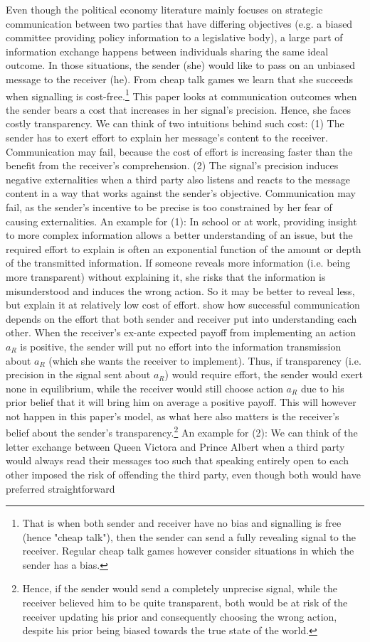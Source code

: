 \documentclass[paper=a4,12pt,DIV=11,twoside=false]{scrartcl}
\begin{document}
\noindent Even though the political economy literature mainly focuses on strategic communication between two parties that have differing objectives (e.g. a biased committee providing policy information to a legislative body), a large part of information exchange happens between individuals sharing the same ideal outcome. In those situations, the sender (she) would like to pass on an unbiased message to the receiver (he). From cheap talk games we learn that she succeeds when signalling is cost-free.\footnote{That is when both sender and receiver have no bias and signalling is free (hence "cheap talk"), then the sender can send a fully revealing signal to the receiver. Regular cheap talk games however consider situations in which the sender has a bias.} This paper looks at communication outcomes when the sender bears a cost that increases in her signal's precision. Hence, she faces costly transparency. We can think of two intuitions behind such cost: (1) The sender has to exert effort to explain her message's content to the receiver. Communication may fail, because the cost of effort is increasing faster than the benefit from the receiver's comprehension. (2) The signal's precision induces negative externalities when a third party also listens and reacts to the message content in a way that works against the sender's objective. Communication may fail, as the sender's incentive to be precise is too constrained by her fear of causing externalities. An example for (1): In school or at work, providing insight to more complex information allows a better understanding of an issue, but the required effort to explain is often an exponential function of the amount or depth of the transmitted information. If someone reveals more information (i.e. being more transparent) without explaining it, she risks that the information is misunderstood and induces the wrong action. So it may be better to reveal less, but explain it at relatively low cost of effort. \citet{DT2005} show how successful communication depends on the effort that both sender and receiver put into understanding each other. When the receiver's ex-ante expected payoff from implementing an action $a_R$ is positive, the sender will put no effort into the information transmission about $a_R$ (which she wants the receiver to implement). Thus, if transparency (i.e. precision in the signal sent about $a_R$) would require effort, the sender would exert none in equilibrium, while the receiver would still choose action $a_R$ due to his prior belief that it will bring him on average a positive payoff. This will however not happen in this paper's model, as what here also matters is the receiver's belief about the sender's transparency.\footnote{Hence, if the sender would send a completely unprecise signal, while the receiver believed him to be quite transparent, both would be at risk of the receiver updating his prior and consequently choosing the wrong action, despite his prior being biased towards the true state of the world.} An example for (2): We can think of the letter exchange between Queen Victora and Prince Albert when a third party would always read their messages too such that speaking entirely open to each other imposed the risk of offending the third party, even though both would have preferred straightforward 
\end{document}
